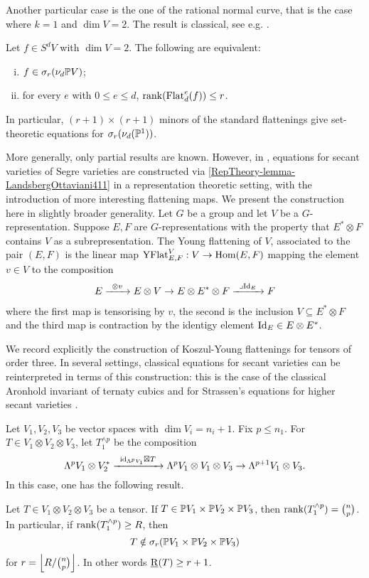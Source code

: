 Another particular case is the one of the rational normal curve, that is the case where $k = 1$ and $\dim V = 2$. The result is classical, see e.g. \cite[Chapter 7]{IK99}.
\begin{theorem}
 \label{RepTheory-theorem-rationalnormalcurves}
 Let $f \in  S^{d} V$ with $\dim V = 2$. The following are equivalent:
 \begin{enumerate}[(i)]
  \item $f \in \sigma_r(\nu_{d} \mathbb{P} V)$;
  \item for every $e$ with $0 \leq e \leq d$, $\mathrm{rank}( \mathrm{Flat}_d^e(f))  \leq r$. 
 \end{enumerate} 
 In particular, $(r+1) \times (r+1)$ minors of the standard flattenings give set-theoretic equations for $\sigma_r(\nu_d(\mathbb{P}^1))$.
\end{theorem}
More generally, only partial results are known. However, in \cite{LO13}, equations for secant varieties of Segre varieties are constructed via \ref{RepTheory-lemma-LandsbergOttaviani411} in a representation theoretic setting, with the introduction of more interesting flattening maps. We present the construction here in slightly broader generality. Let $G$ be a group and let $V$ be a $G$-representation. Suppose $E,F$ are $G$-representations with the property that $E^* \otimes F$ contains $V$ as a subrepresentation. The Young flattening of $V$, associated to the pair $(E,F)$ is the linear map $\mathrm{YFlat}^V_{E,F} : V \to \operatorname{Hom}( E,F)$ mapping the element $v \in V$ to the composition
\begin{align*}
E \xto{\otimes v} E \otimes V \to E \otimes E^* \otimes F \xto{\lrcorner \Id_E} F
\end{align*}
where the first map is tensorising by $v$, the second is the inclusion $V \subseteq E^* \otimes F$ and the third map is contraction by the identigy element $\mathrm{Id}_E \in E \otimes E^*$.

We record explicitly the construction of Koszul-Young flattenings for tensors of order three. In several settings, classical equations for secant varieties can be reinterpreted in terms of this construction: this is the case of the classical Aronhold invariant of ternaty cubics \cite[Prop. 4.4.7]{Stu93} and for Strassen's equations for higher secant varieties \cite{Str83,LO13}.

Let $V_1,V_2,V_3$ be vector spaces with $\dim V_i = n_i+1$. Fix $p \leq n_1$. For $T \in V_1 \otimes V_2 \otimes V_3$, let $T_1^{\wedge p} $ be the composition
\[
\Lambda^p V_1 \otimes V_2^*  \xto{\id_{\Lambda^p V_1} \boxtimes T} \Lambda^p V_1 \otimes V_1 \otimes V_3 \to \Lambda^{p+1} V_1 \otimes V_3.
\]
In this case, one has the following result.
\begin{proposition}
 \label{RepTheory-proposition-KoszulFlat}
 Let $T \in V_1 \otimes V_2 \otimes V_3$ be a tensor. If $T \in \mathbb{P} V_1 \times \mathbb{P} V_2 \times \mathbb{P} V_3$, then $\mathrm{rank}( T_1^{\wedge p}) = \binom{n}{p}$. In particular, if $\mathrm{rank} ( T_1^{\wedge p} ) \geq R$, then 
 \[
T \notin \sigma_r ( \mathbb{P} V_1 \times \mathbb{P} V_2 \times \mathbb{P} V_3) 
 \]
for $r = \Bigl\lfloor R / \binom{n}{p} \Bigr\rfloor$. In other words $\underline{\mathrm{R}}(T) \geq r+1$.
\end{proposition}



